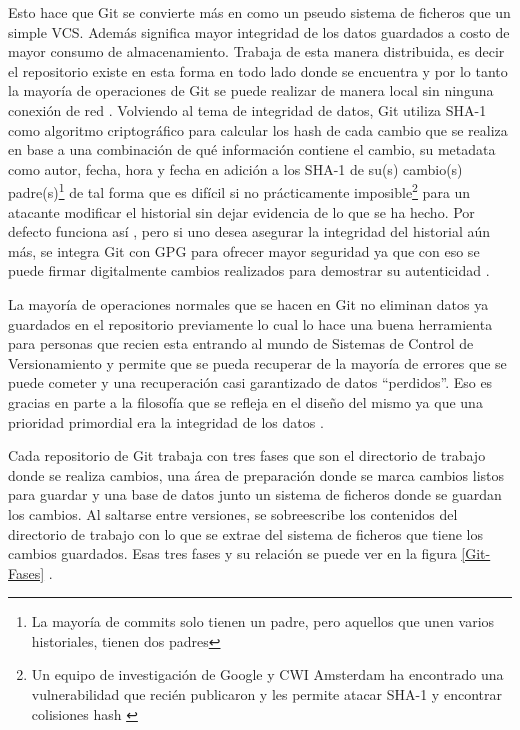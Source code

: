 Esto hace que Git se convierte más en como un pseudo sistema de ficheros que un simple VCS. Además significa mayor integridad de los datos guardados a costo de mayor consumo de almacenamiento. Trabaja de esta manera distribuida, es decir el repositorio existe en esta forma en todo lado donde se encuentra y por lo tanto la mayoría de operaciones de Git se puede realizar de manera local sin ninguna conexión de red \citep{PROGIT-Git-Intro}.
Volviendo al tema de integridad de datos, Git utiliza SHA-1 como algoritmo criptográfico para calcular los hash de cada cambio que se realiza en base a una combinación de qué información contiene el cambio, su metadata como autor, fecha, hora y fecha en adición a los SHA-1 de su(s) cambio(s) padre(s)\footnote{La mayoría de commits solo tienen un padre, pero aquellos que unen varios historiales, tienen dos padres} de tal forma que es difícil si no prácticamente imposible\footnote{Un equipo de investigación de Google y CWI Amsterdam ha encontrado una vulnerabilidad que recién publicaron y les permite atacar SHA-1 y encontrar colisiones hash \citep{Shattered-Paper}} para un atacante modificar el historial sin dejar evidencia de lo que se ha hecho. Por defecto funciona así \citep{PROGIT-Git-Intro}, pero si uno desea asegurar la integridad del historial aún más, se integra Git con GPG para ofrecer mayor seguridad ya que con eso se puede firmar digitalmente cambios realizados para demostrar su autenticidad \citep{PROGIT-Git-GPG}.

La mayoría de operaciones normales  que se hacen en Git no eliminan datos ya guardados en el repositorio previamente lo cual lo hace una buena herramienta para personas que recien esta entrando al mundo de Sistemas de Control de Versionamiento y permite que se pueda recuperar de la mayoría de errores que se puede cometer y una recuperación casi garantizado de datos “perdidos”. Eso es gracias en parte a la filosofía que se refleja en el diseño del mismo ya que una prioridad primordial era la integridad de los datos \citep{PROGIT-Git-Intro}.

Cada repositorio de Git trabaja con tres fases que son el directorio de trabajo donde se realiza cambios, una área de preparación donde se marca cambios listos para guardar y una base de datos junto un sistema de ficheros donde se guardan los cambios. Al saltarse entre versiones, se sobreescribe los contenidos del directorio de trabajo con lo que se extrae del sistema de ficheros que tiene los cambios guardados. Esas tres fases y su relación se puede ver en la figura \ref{Git-Fases} \citep{PROGIT-Git-Intro}.

